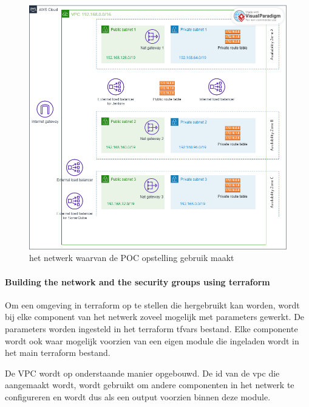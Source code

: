 \begin{figure}[H]
  \includegraphics[scale=0.45]{graphics/network.png}
\caption{\label{fig:aws_networkfigure} het netwerk waarvan de POC opstelling gebruik maakt}
\end{figure}

\paragraph{
{Building the network and the security groups using terraform}}
\label{sec:Bouwen van het netwerk en de security groups met terraform}

Om een omgeving in terraform op te stellen die hergebruikt kan worden, wordt bij elke component van het netwerk zoveel mogelijk met parameters gewerkt. De parameters worden ingesteld in het terraform tfvars bestand. Elke componente wordt ook waar mogelijk voorzien van een eigen module die ingeladen wordt in het main terraform bestand.
\newline

De VPC wordt op onderstaande manier opgebouwd. De id van de vpc die aangemaakt wordt, wordt gebruikt om andere componenten in het netwerk te configureren en wordt dus als een output voorzien binnen deze module.
\newline


